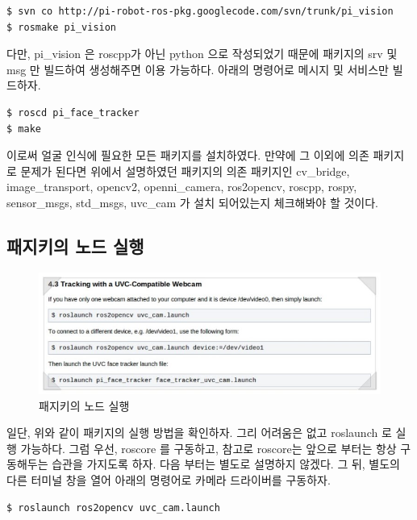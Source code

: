 \begin{lstlisting}[language=ROS]
$ svn co http://pi-robot-ros-pkg.googlecode.com/svn/trunk/pi_vision
$ rosmake pi_vision
\end{lstlisting}

다만, pi\_vision 은 roscpp가 아닌 python 으로 작성되었기 때문에 패키지의 srv 및 msg 만 빌드하여 생성해주면 이용 가능하다.  아래의 명령어로 메시지 및 서비스만 빌드하자.

\begin{lstlisting}[language=ROS]
$ roscd pi_face_tracker
$ make
\end{lstlisting}

이로써 얼굴 인식에 필요한 모든 패키지를 설치하였다. 만약에 그 이외에 의존 패키지로 문제가 된다면 위에서 설명하였던 패키지의 의존 패키지인 cv\_bridge, image\_transport, opencv2, openni\_camera, ros2opencv, roscpp, rospy, sensor\_msgs, std\_msgs, uvc\_cam 가 설치 되어있는지 체크해봐야 할 것이다.

\subsection{패지키의 노드 실행}

\begin{figure}[h]
\centering\includegraphics[width=0.9\columnwidth]{pictures/chapter8/openpkg5.jpg}
\caption{패지키의 노드 실행}
\end{figure}

일단, 위와 같이 패키지의 실행 방법을 확인하자. 그리 어려움은 없고 roslaunch 로 실행 가능하다. 그럼 우선, roscore 를 구동하고, 참고로 roscore는 앞으로 부터는 항상 구동해두는 습관을 가지도록 하자. 다음 부터는 별도로 설명하지 않겠다. 그 뒤, 별도의 다른 터미널 창을 열어 아래의 명령어로 카메라 드라이버를 구동하자.

\begin{lstlisting}[language=ROS]
$ roslaunch ros2opencv uvc_cam.launch
\end{lstlisting}

